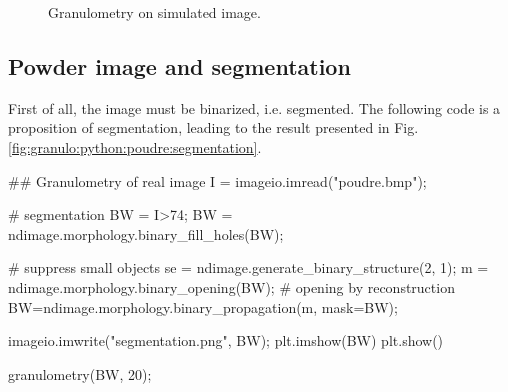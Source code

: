 \begin{figure}[H]
\centering\caption{Granulometry on simulated image.}%
 
 \hfill
 \label{fig:granulo:python:simu}%
\end{figure}


\subsection{Powder image and segmentation}

First of all, the image must be binarized, i.e. segmented. The following code is a proposition of segmentation, leading to the result presented in Fig. \ref{fig:granulo:python:poudre:segmentation}.

\begin{python}
## Granulometry of real image
I = imageio.imread("poudre.bmp");

# segmentation
BW = I>74;
BW = ndimage.morphology.binary_fill_holes(BW);

# suppress small objects
se = ndimage.generate_binary_structure(2, 1);
m = ndimage.morphology.binary_opening(BW);
# opening by reconstruction
BW=ndimage.morphology.binary_propagation(m, mask=BW);

imageio.imwrite("segmentation.png", BW);
plt.imshow(BW)
plt.show()

granulometry(BW, 20);
\end{python}


